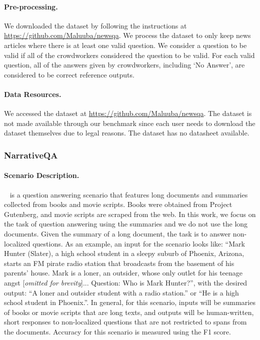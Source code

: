 \paragraph{Pre-processing.}
We downloaded the dataset by following the instructions at \url{https://github.com/Maluuba/newsqa}. We process the dataset to only keep news articles where there is at least one valid question. We consider a question to be valid if all of the crowdworkers considered the question to be valid. For each valid question, all of the answers given by crowdworkers, including `No Answer', are considered to be correct reference outputs.


\paragraph{Data Resources.} We accessed the dataset at \url{https://github.com/Maluuba/newsqa}. The dataset is not made available through our benchmark since each user needs to download the dataset themselves due to legal reasons. The dataset has no datasheet available.

\subsubsection{NarrativeQA}
\paragraph{Scenario Description.}
\narrativeqa~\citep{kovcisky2017narrativeqa} is a question answering scenario that features long documents and summaries collected from books and movie scripts. Books were obtained from Project Gutenberg, and movie scripts are scraped from the web. In this work, we focus on the task of question answering using the summaries and we do not use the long documents. Given the summary of a long document, the task is to answer non-localized questions.
As an example, an input for the scenario looks like: ``Mark Hunter (Slater), a high school student in a sleepy suburb of Phoenix, Arizona, starts an FM pirate radio station that broadcasts from the basement of his parents' house. Mark is a loner, an outsider, whose only outlet for his teenage angst [\textit{omitted for brevity}]...
Question: Who is Mark Hunter?'', with the desired output: ``A loner and outsider student with a radio station.'' or ``He is a high school student in Phoenix.''.
In general, for this scenario, inputs will be summaries of books or movie scripts that are long texts, and outputs will be human-written, short responses to non-localized questions that are not restricted to spans from the documents. 
Accuracy for this scenario is measured using the F1 score.

